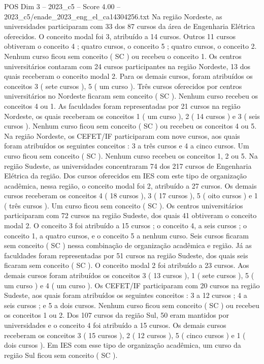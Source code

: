 \begin{textsample}{POS Dim 3 – 2023\_c5 – Score 4.00 – 2023\_c5/enade\_2023\_eng\_el\_ca14304256.txt}
Na região Nordeste, as universidades participaram com 33 dos 87 cursos da área de Engenharia Elétrica oferecidos.
O conceito modal foi 3, atribuído a 14 cursos.
Outros 11 cursos obtiveram o conceito 4 ; quatro cursos, o conceito 5 ; quatro cursos, o conceito 2.
Nenhum curso ficou sem conceito ( SC ) ou recebeu o conceito 1.
Os centros universitários contaram com 24 cursos participantes na região Nordeste, 13 dos quais receberam o conceito modal 2.
Para os demais cursos, foram atribuídos os conceitos 3 ( sete cursos ), 5 ( um curso ).
Três cursos oferecidos por centros universitários no Nordeste ficaram sem conceito ( SC ).
Nenhum curso recebeu os conceitos 4 ou 1.
As faculdades foram representadas por 21 cursos na região Nordeste, os quais receberam os conceitos 1 ( um curso ), 2 ( 14 cursos ) e 3 ( seis cursos ).
Nenhum curso ficou sem conceito ( SC ) ou recebeu os conceitos 4 ou 5.
Na região Nordeste, os CEFET/IF participaram com nove cursos, aos quais foram atribuídos os seguintes conceitos : 3 a três cursos e 4 a cinco cursos.
Um curso ficou sem conceito ( SC ).
Nenhum curso recebeu os conceitos 1, 2 ou 5.
Na região Sudeste, as universidades concentraram 74 dos 217 cursos de Engenharia Elétrica da região.
Dos cursos oferecidos em IES com este tipo de organização acadêmica, nessa região, o conceito modal foi 2, atribuído a 27 cursos.
Os demais cursos receberam os conceitos 4 ( 18 cursos ), 3 ( 17 cursos ), 5 ( oito cursos ) e 1 ( três cursos ).
Um curso ficou sem conceito ( SC ).
Os centros universitários participaram com 72 cursos na região Sudeste, dos quais 41 obtiveram o conceito modal 2.
O conceito 3 foi atribuído a 15 cursos ; o conceito 4, a seis cursos ; o conceito 1, a quatro cursos, e o conceito 5 a nenhum curso.
Seis cursos ficaram sem conceito ( SC ) nessa combinação de organização acadêmica e região.
Já as faculdades foram representadas por 51 cursos na região Sudeste, dos quais seis ficaram sem conceito ( SC ).
O conceito modal 2 foi atribuído a 23 cursos.
Aos demais cursos foram atribuídos os conceitos 3 ( 13 cursos ), 1 ( sete cursos ), 5 ( um curso ) e 4 ( um curso ).
Os CEFET/IF participaram com 20 cursos na região Sudeste, aos quais foram atribuídos os seguintes conceitos : 3 a 12 cursos ; 4 a seis cursos ; e 5 a dois cursos.
Nenhum curso ficou sem conceito ( SC ) ou recebeu os conceitos 1 ou 2.
Dos 107 cursos da região Sul, 50 eram mantidos por universidades e o conceito 4 foi atribuído a 15 cursos.
Os demais cursos receberam os conceitos 3 ( 15 cursos ), 2 ( 12 cursos ), 5 ( cinco cursos ) e 1 ( dois cursos ).
Em IES com esse tipo de organização acadêmica, um curso da região Sul ficou sem conceito ( SC ).

\end{textsample}

